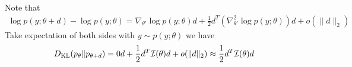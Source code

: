 \begin{answer}
Note that 
\begin{align*}
\log p(y;\theta+d) - \log p(y;\theta) = \nabla_{\theta'}\log p(y;\theta)d + \frac{1}{2}d^T(\nabla^2_{\theta'}\log p(y;\theta))d + o(\|d\|_{2})
\end{align*}
Take expectation of both sides with $ y\sim p(y;\theta) $ we have
\begin{align*}
D_{\text{KL}}(p_\theta\|p_{\theta+d}) = 0 d + \frac{1}{2}d^T\mathcal{I}(\theta)d + o(\|d\|_{2}) \approx \frac{1}{2}d^T\mathcal{I}(\theta)d
\end{align*}
\end{answer}
